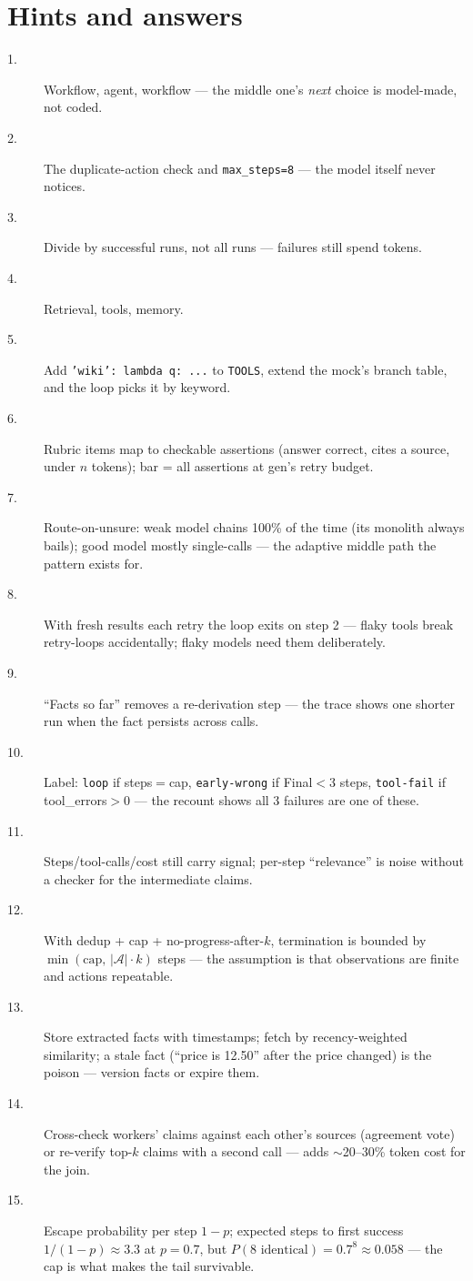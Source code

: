 \section*{Hints and answers}
\begin{description}
\item[1.] Workflow, agent, workflow --- the middle one's
\emph{next} choice is model-made, not coded.
\item[2.] The duplicate-action check and \texttt{max\_steps=8} ---
the model itself never notices.
\item[3.] Divide by successful runs, not all runs --- failures still
spend tokens.
\item[4.] Retrieval, tools, memory.
\item[5.] Add \texttt{'wiki': lambda q: ...} to \texttt{TOOLS},
extend the mock's branch table, and the loop picks it by keyword.
\item[6.] Rubric items map to checkable assertions (answer correct,
cites a source, under $n$ tokens); bar = all assertions at gen's
retry budget.
\item[7.] Route-on-unsure: weak model chains 100\% of the time (its
monolith always bails); good model mostly single-calls --- the
adaptive middle path the pattern exists for.
\item[8.] With fresh results each retry the loop exits on step 2 ---
flaky tools break retry-loops accidentally; flaky models need them
deliberately.
\item[9.] ``Facts so far'' removes a re-derivation step --- the trace
shows one shorter run when the fact persists across calls.
\item[10.] Label: \texttt{loop} if steps$=$cap, \texttt{early-wrong}
if Final$<$3 steps, \texttt{tool-fail} if tool\_errors$>$0 ---
the recount shows all 3 failures are one of these.
\item[11.] Steps/tool-calls/cost still carry signal; per-step
``relevance'' is noise without a checker for the intermediate
claims.
\item[12.] With dedup + cap + no-progress-after-$k$, termination is
bounded by $\min(\text{cap},\, |\mathcal A|\cdot k)$ steps ---
the assumption is that observations are finite and actions
repeatable.
\item[13.] Store extracted facts with timestamps; fetch by
recency-weighted similarity; a stale fact (``price is 12.50'' after
the price changed) is the poison --- version facts or expire them.
\item[14.] Cross-check workers' claims against each other's sources
(agreement vote) or re-verify top-$k$ claims with a second call ---
adds $\sim$20--30\% token cost for the join.
\item[15.] Escape probability per step $1-p$; expected steps to
first success $1/(1-p) \approx 3.3$ at $p{=}0.7$, but $P(\text{8
identical}) = 0.7^8 \approx 0.058$ --- the cap is what makes the
tail survivable.
\end{description}
